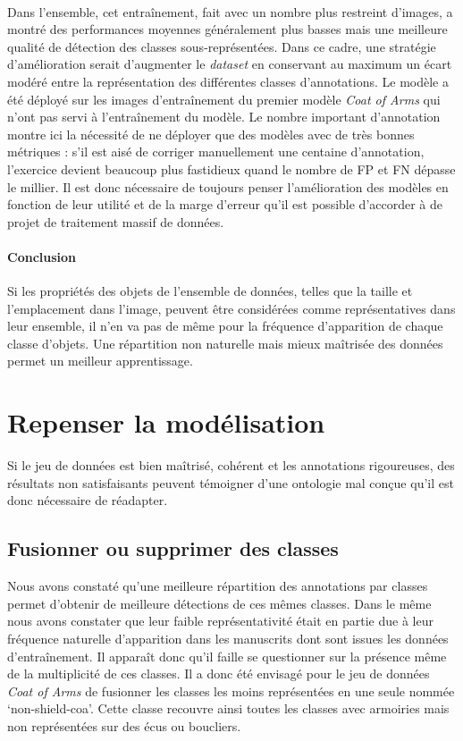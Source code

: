 \documentclass[12pt,twoside]{book}
\begin{document}
\paragraph{}Dans l'ensemble, cet entraînement, fait avec un nombre plus restreint d'images, a montré des performances moyennes généralement plus basses mais une meilleure qualité de détection des classes sous-représentées. Dans ce cadre, une stratégie d'amélioration serait d'augmenter le \textit{dataset} en conservant au maximum un écart modéré entre la représentation des différentes classes d'annotations. Le modèle a été déployé sur les images d’entraînement du premier modèle \textit{Coat of Arms} qui n’ont pas servi à l’entraînement du modèle. Le nombre important d’annotation montre ici la nécessité de ne déployer que des modèles avec de très bonnes métriques : s’il est aisé de corriger manuellement une centaine d’annotation, l’exercice devient beaucoup plus fastidieux quand le nombre de FP et FN dépasse le millier. Il est donc nécessaire de toujours penser l’amélioration des modèles en fonction de leur utilité et de la marge d’erreur qu'il est possible d’accorder à de projet de traitement massif de données.  \\

\paragraph{Conclusion} Si les propriétés des objets de l'ensemble de données, telles que la taille et l'emplacement dans l'image, peuvent être considérées comme représentatives dans leur ensemble, il n'en va pas de même pour la fréquence d'apparition de chaque classe d'objets. Une répartition non naturelle mais mieux maîtrisée des données permet un meilleur apprentissage. 

\newpage
\section{Repenser la modélisation}

Si le jeu de données est bien maîtrisé, cohérent et les annotations rigoureuses, des résultats non satisfaisants peuvent témoigner d’une ontologie mal conçue qu’il est donc nécessaire de réadapter.

\subsection{Fusionner ou supprimer des classes}

Nous avons constaté qu'une meilleure répartition des annotations par classes permet d’obtenir de meilleure détections de ces mêmes classes. Dans le même nous avons constater que leur faible représentativité était en partie due à leur fréquence naturelle d’apparition dans les manuscrits dont sont issues les données d’entraînement. Il apparaît donc qu'il faille se questionner sur la présence même de la multiplicité de ces classes. Il a donc été envisagé pour le jeu de données \textit{Coat of Arms} de fusionner les classes les moins représentées en une seule nommée ‘non-shield-coa’. Cette classe recouvre ainsi toutes les classes avec armoiries mais non représentées sur des écus ou boucliers.
\end{document}
